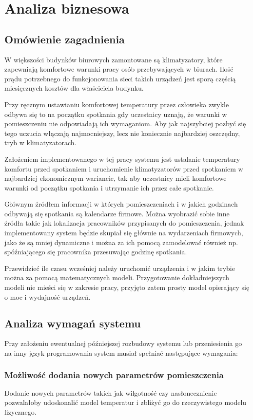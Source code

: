 \chapter{Analiza biznesowa}
\section{Omówienie zagadnienia}
W większości budynków biurowych zamontowane są klimatyzatory, które zapewniają komfortowe warunki pracy osób przebywających w biurach. 
Ilość prądu potrzebnego do funkcjonowania sieci takich urządzeń jest sporą częścią miesięcznych kosztów dla właściciela budynku.

Przy ręcznym ustawianiu komfortowej temperatury przez człowieka zwykle odbywa się to na początku spotkania gdy uczestnicy uznają, że warunki w pomieszczeniu nie odpowiadają ich wymaganiom. Aby jak najszybciej pozbyć się tego uczucia włączają najmocniejszy, lecz nie koniecznie najbardziej oszczędny, tryb w klimatyzatorach.

Założeniem implementowanego w tej pracy systemu jest ustalanie temperatury komfortu przed spotkaniem i uruchomienie klimatyzatorów przed spotkaniem w najbardziej ekonomicznym wariancie, tak aby uczestnicy mieli komfortowe warunki od początku spotkania i utrzymanie ich przez całe spotkanie. 

Głównym źródłem informacji w których pomieszczeniach i w jakich godzinach odbywają się spotkania są kalendarze firmowe. Można wyobrazić sobie inne źródła takie jak lokalizacja pracowników przypisanych do pomieszczenia, jednak implementowany system będzie skupiał się głównie na wydarzeniach firmowych, jako że są mniej dynamiczne i można za ich pomocą zamodelować również np. spóźniającego się pracownika przesuwając godzinę spotkania.

Przewidzieć ile czasu wcześniej należy uruchomić urządzenia i w jakim trybie można za pomocą matematycznych modeli. Przygotowanie dokładniejszych modeli nie mieści się w zakresie pracy, przyjęto zatem prosty model opierający się o moc i wydajność urządzeń. 

\section{Analiza wymagań systemu}
Przy założeniu ewentualnej późniejszej rozbudowy systemu lub przeniesienia go na inny język programowania system musiał spełniać następujące wymagania:

\subsection*{Możliwość dodania nowych parametrów pomieszczenia}
Dodanie nowych parametrów takich jak wilgotność czy nasłonecznienie pozwalałoby udoskonalić model temperatur i zbliżyć go do rzeczywistego modelu fizycznego.

